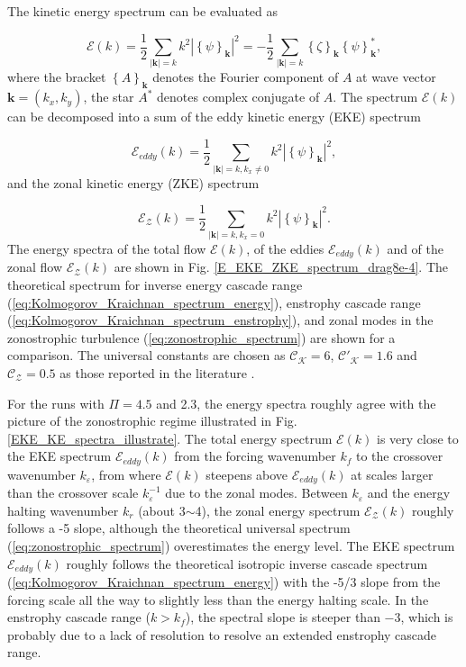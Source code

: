 \documentclass{ametsoc}
\begin{document}
The kinetic energy spectrum can be evaluated as

\begin{equation}
\mathcal{E}(k)=\frac{1}{2}\underset{|\mathbf{k}|=k}{\sum}k^{2}|\left\{ \psi\right\} _{\mathbf{k}}|^{2}=-\frac{1}{2}\underset{|\mathbf{k}|=k}{\sum}\left\{ \zeta\right\} _{\mathbf{k}}\left\{ \psi\right\} _{\mathbf{k}}^{*},\label{eq:energy_spectrum_psi_zeta}
\end{equation}
where the bracket $\left\{ A\right\} _{\mathbf{k}}$ denotes the Fourier
component of $A$ at wave vector $\mathbf{k}=(k_{x},k_{y})$, the
star $A^{*}$ denotes complex conjugate of $A$. The spectrum $\mathcal{E}(k)$
can be decomposed into a sum of the eddy kinetic energy (EKE) spectrum

\begin{equation}
\mathcal{E}_{eddy}(k)=\frac{1}{2}\underset{|\mathbf{k}|=k,k_{x}\neq0}{\sum}k^{2}|\left\{ \psi\right\} _{\mathbf{k}}|^{2},\label{eq:EKE_spec_psi}
\end{equation}
and the zonal kinetic energy (ZKE) spectrum

\begin{equation}
\mathcal{E}_{\mathcal{Z}}(k)=\frac{1}{2}\underset{|\mathbf{k}|=k,k_{x}=0}{\sum}k^{2}|\left\{ \psi\right\} _{\mathbf{k}}|^{2}.\label{eq:ZKE_spec_psi}
\end{equation}
The energy spectra of the total flow $\mathcal{E}(k)$, of the eddies
$\mathcal{E}_{eddy}(k)$ and of the zonal flow $\mathcal{E}_{\mathcal{Z}}(k)$
are shown in Fig. \ref{E_EKE_ZKE_spectrum_drag8e-4}. The theoretical
spectrum for inverse energy cascade range (\ref{eq:Kolmogorov_Kraichnan_spectrum_energy}),
enstrophy cascade range (\ref{eq:Kolmogorov_Kraichnan_spectrum_enstrophy}),
and zonal modes in the zonostrophic turbulence (\ref{eq:zonostrophic_spectrum})
are shown for a comparison. The universal constants are chosen as
$\mathcal{C_{K}}=6$, $\mathcal{C'_{K}}=1.6$ and $\mathcal{C_{Z}}=0.5$
as those reported in the literature \citep{Boffetta2012,Galperin2010}.

For the runs with $\Pi=4.5$ and 2.3, the energy spectra roughly agree
with the picture of the zonostrophic regime illustrated in Fig. \ref{EKE_KE_spectra_illustrate}.
The total energy spectrum $\mathcal{E}(k)$ is very close to the EKE
spectrum $\mathcal{E}_{eddy}(k)$ from the forcing wavenumber $k_{f}$
to the crossover wavenumber $k_{\varepsilon}$, from where $\mathcal{E}(k)$
steepens above $\mathcal{E}_{eddy}(k)$ at scales larger than the
crossover scale $k_{\varepsilon}^{-1}$ due to the zonal modes. Between
$k_{\varepsilon}$ and the energy halting wavenumber $k_{r}$ (about
3$\sim$4), the zonal energy spectrum $\mathcal{E}_{\mathcal{Z}}(k)$
roughly follows a -5 slope, although the theoretical universal spectrum
(\ref{eq:zonostrophic_spectrum}) overestimates the energy level.
The EKE spectrum $\mathcal{E}_{eddy}(k)$ roughly follows the theoretical
isotropic inverse cascade spectrum (\ref{eq:Kolmogorov_Kraichnan_spectrum_energy})
with the -5/3 slope from the forcing scale all the way to slightly
less than the energy halting scale. In the enstrophy cascade range
($k>k_{f}$), the spectral slope is steeper than $-3$, which is probably
due to a lack of resolution to resolve an extended enstrophy cascade
range.
\end{document}
